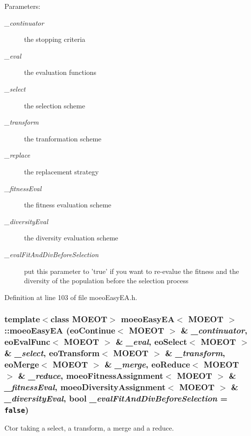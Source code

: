 \begin{Desc}
\item[Parameters:]
\begin{description}
\item[{\em \_\-continuator}]the stopping criteria \item[{\em \_\-eval}]the evaluation functions \item[{\em \_\-select}]the selection scheme \item[{\em \_\-transform}]the tranformation scheme \item[{\em \_\-replace}]the replacement strategy \item[{\em \_\-fitness\-Eval}]the fitness evaluation scheme \item[{\em \_\-diversity\-Eval}]the diversity evaluation scheme \item[{\em \_\-eval\-Fit\-And\-Div\-Before\-Selection}]put this parameter to 'true' if you want to re-evalue the fitness and the diversity of the population before the selection process \end{description}
\end{Desc}


Definition at line 103 of file moeo\-Easy\-EA.h.
\subsubsection{\setlength{\rightskip}{0pt plus 5cm}template$<$class MOEOT$>$ \bf{moeo\-Easy\-EA}$<$ MOEOT $>$::\bf{moeo\-Easy\-EA} (\bf{eo\-Continue}$<$ MOEOT $>$ \& {\em \_\-continuator}, \bf{eo\-Eval\-Func}$<$ MOEOT $>$ \& {\em \_\-eval}, \bf{eo\-Select}$<$ MOEOT $>$ \& {\em \_\-select}, \bf{eo\-Transform}$<$ MOEOT $>$ \& {\em \_\-transform}, \bf{eo\-Merge}$<$ MOEOT $>$ \& {\em \_\-merge}, \bf{eo\-Reduce}$<$ MOEOT $>$ \& {\em \_\-reduce}, \bf{moeo\-Fitness\-Assignment}$<$ MOEOT $>$ \& {\em \_\-fitness\-Eval}, \bf{moeo\-Diversity\-Assignment}$<$ MOEOT $>$ \& {\em \_\-diversity\-Eval}, bool {\em \_\-eval\-Fit\-And\-Div\-Before\-Selection} = {\tt false})\hspace{0.3cm}{\tt  [inline]}}\label{classmoeoEasyEA_564a3291a8239515328cf0a6b40f3c99}


Ctor taking a select, a transform, a merge and a reduce. 

